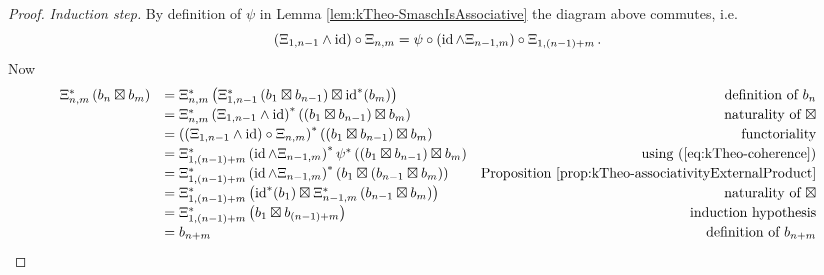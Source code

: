 \begin{proof}
	\emph{Induction step.} By definition of $\psi$ in Lemma
	\ref{lem:kTheo-SmaschIsAssociative} the diagram above commutes, i.e.
	\begin{equation}\label{eq:kTheo-coherence}
		\left(\Xi_{1,n-1}\wedge\operatorname{\mathrm{id}}\right)\circ\Xi_{n,m}
		=\psi\circ\left(\operatorname{\mathrm{id}}\wedge\Xi_{n-1,m}\right)\circ\Xi_{1,(n-1)+m}\,.
	\end{equation}
	Now
	\begin{equation*}
    \begin{array}{llr}
        \Xi_{n,m}^{*}\left(b_n\boxtimes b_m\right)
        &=\Xi_{n,m}^{*}\left(\Xi_{1,n-1}^{*}\left(b_1\boxtimes b_{n-1}\right)\boxtimes\operatorname{\mathrm{id}}^{*}(b_m)\right)
        & \text{definition of } b_n\\[2pt]
        &=\Xi_{n,m}^{*}\left(\Xi_{1,n-1}\wedge\operatorname{\mathrm{id}}\right)^{*}\left(\left(b_1\boxtimes b_{n-1}\right)\boxtimes b_m\right)
        & \text{naturality of }\boxtimes\\[2pt]
        &=\left(\left(\Xi_{1,n-1}\wedge\operatorname{\mathrm{id}}\right)\circ\Xi_{n,m}\right)^{*}\left(\left(b_1\boxtimes b_{n-1}\right)\boxtimes b_m\right)
        & \text{functoriality}\\[2pt]
        &=\Xi_{1,(n-1)+m}^{*}\left(\operatorname{\mathrm{id}}\wedge\Xi_{n-1,m}\right)^{*}\psi^{*}\left(\left(b_1\boxtimes b_{n-1}\right)\boxtimes b_m\right)
        & \text{using (\ref{eq:kTheo-coherence})}\\[2pt]
        &=\Xi_{1,(n-1)+m}^{*}\left(\operatorname{\mathrm{id}}\wedge\Xi_{n-1,m}\right)^{*}\left(b_1\boxtimes\left(b_{n-1}\boxtimes b_m\right)\right)
        & \text{Proposition \ref{prop:kTheo-associativityExternalProduct}}\\[2pt]
        &=\Xi_{1,(n-1)+m}^{*}\left(\operatorname{\mathrm{id}}^{*}(b_1)\boxtimes\Xi_{n-1,m}^{*}\left(b_{n-1}\boxtimes b_m\right)\right)
        & \text{naturality of }\boxtimes\\[2pt]
        &=\Xi_{1,(n-1)+m}^{*}\left(b_1\boxtimes b_{(n-1)+m}\right)
        & \text{induction hypothesis}\\[2pt]
        &=b_{n+m}
        & \text{definition of } b_{n+m}
    \end{array}
\end{equation*}
\end{proof}